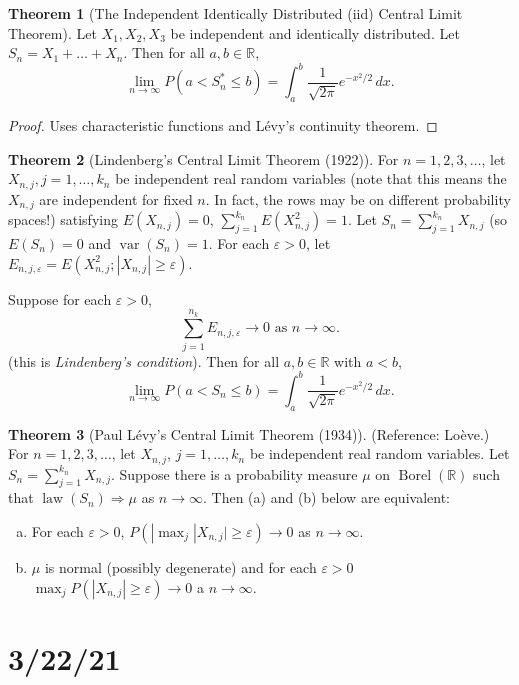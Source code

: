 \documentclass{article}
\DeclareMathOperator{\law}{law}
\DeclareMathOperator{\Borel}{Borel}
\newcommand{\R}{\mathbb{R}}
\DeclareMathOperator{\var}{var}
\theoremstyle{definition}
\newtheorem{theorem}{Theorem}
\begin{document}
\begin{theorem}[The Independent Identically Distributed (iid) Central Limit Theorem]
Let $X_1, X_2, X_3$ be independent and identically distributed. Let $S_n = X_1 + \dots + X_n$. Then for all $a, b \in \R$,
\[
    \lim_{n\to\infty} P(a < S_n^* \leq b) = \int_a^b \frac{1}{\sqrt{2\pi}}e^{-x^2/2} \,dx.
\]
\end{theorem}
\begin{proof}
    Uses characteristic functions and Lévy's continuity theorem.
\end{proof}

\begin{theorem}[Lindenberg's Central Limit Theorem (1922)]
For $n = 1, 2, 3, \dots$, let $X_{n,j}, j = 1, \dots, k_n$ be independent real random variables (note that this means the $X_{n,j}$ are independent for fixed $n$. In fact, the rows may be on different probability spaces!) satisfying $E(X_{n,j}) = 0$, $\sum_{j=1}^{k_n} E(X_{n,j}^2) = 1$. Let $S_n = \sum_{j=1}^{k_n} X_{n,j}$ (so $E(S_n) = 0$ and $\var(S_n) = 1$. For each $\varepsilon > 0$, let $E_{n,j,\varepsilon} = E(X_{n,j}^2 ; |X_{n,j}| \geq \varepsilon)$.

Suppose for each $\varepsilon > 0$,
\[
    \sum_{j=1}^{n_k} E_{n,j,\varepsilon} \to 0 \text{ as } n \to \infty.
\]
(this is \emph{Lindenberg's condition}). Then for all $a, b \in \R$ with $a < b$,
\[
    \lim_{n\to\infty} P(a < S_n \leq b) = \int_a^b \frac{1}{\sqrt{2\pi}} e^{-x^2/2} \,dx.
\]
\end{theorem}

\begin{theorem}[Paul Lévy's Central Limit Theorem (1934)]
(Reference: Lo\`{e}ve.) For $n = 1, 2, 3, \dots$, let $X_{n,j}$, $j = 1, \dots, k_n$ be independent real random variables. Let $S_n = \sum_{j=1}^{k_n} X_{n,j}$. Suppose there is a probability measure $\mu$ on $\Borel(\R)$ such that $\law(S_n) \Rightarrow \mu$ as $n \to \infty$. Then (a) and (b) below are equivalent:
\begin{enumerate}[(a)]
    \item For each $\varepsilon > 0$, $P(|\max_j|X_{n,j}| \geq \varepsilon) \to 0$ as $n \to \infty$.
    \item $\mu$ is normal (possibly degenerate) and for each $\varepsilon > 0$ $\max_j P(|X_{n,j}| \geq \varepsilon) \to 0$ a $n \to \infty$.
\end{enumerate}
\end{theorem}

\section*{3/22/21}
\end{document}
